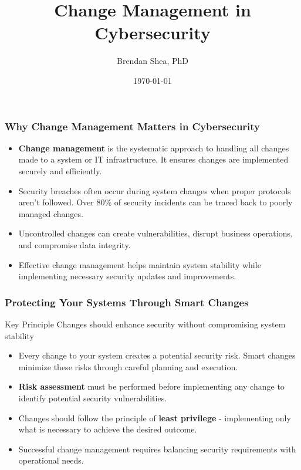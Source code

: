 \documentclass{beamer}
\title{Change Management in Cybersecurity}
\author{Brendan Shea, PhD}
\date{\today}
\begin{document}
\begin{frame}
\titlepage
\end{frame}

\begin{frame}
\frametitle{Why Change Management Matters in Cybersecurity}
\begin{itemize}
    \item \textbf{Change management} is the systematic approach to handling all changes made to a system or IT infrastructure. It ensures changes are implemented securely and efficiently.
    
    \item Security breaches often occur during system changes when proper protocols aren't followed. Over 80\% of security incidents can be traced back to poorly managed changes.
    
    \item Uncontrolled changes can create vulnerabilities, disrupt business operations, and compromise data integrity.
    
    \item Effective change management helps maintain system stability while implementing necessary security updates and improvements.
\end{itemize}
\end{frame}

\begin{frame}
\frametitle{Protecting Your Systems Through Smart Changes}
\begin{alertblock}{Key Principle}
Changes should enhance security without compromising system stability
\end{alertblock}
\begin{itemize}
    \item Every change to your system creates a potential security risk. Smart changes minimize these risks through careful planning and execution.
    
    \item \textbf{Risk assessment} must be performed before implementing any change to identify potential security vulnerabilities.
    
    \item Changes should follow the principle of \textbf{least privilege} - implementing only what is necessary to achieve the desired outcome.
    
    \item Successful change management requires balancing security requirements with operational needs.
\end{itemize}
\end{frame}
\end{document}
